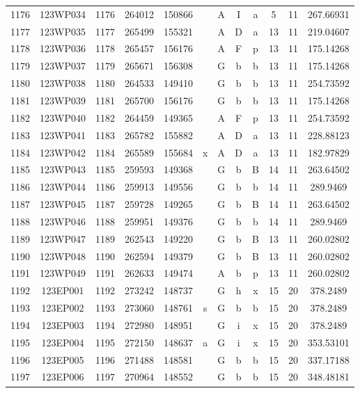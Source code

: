 \begin{tabular}{|*{12}{c|}}
1176 & 123WP034 & 1176 & 264012 & 150866 &  & A & I & a & 5 & 11 & 267.66931 \\ 
1177 & 123WP035 & 1177 & 265499 & 155321 &  & A & D & a & 13 & 11 & 219.04607 \\ 
1178 & 123WP036 & 1178 & 265457 & 156176 &  & A & F & p & 13 & 11 & 175.14268 \\ 
1179 & 123WP037 & 1179 & 265671 & 156308 &  & G & b & b & 13 & 11 & 175.14268 \\ 
1180 & 123WP038 & 1180 & 264533 & 149410 &  & G & b & b & 13 & 11 & 254.73592 \\ 
1181 & 123WP039 & 1181 & 265700 & 156176 &  & G & b & b & 13 & 11 & 175.14268 \\ 
1182 & 123WP040 & 1182 & 264459 & 149365 &  & A & F & p & 13 & 11 & 254.73592 \\ 
1183 & 123WP041 & 1183 & 265782 & 155882 &  & A & D & a & 13 & 11 & 228.88123 \\ 
1184 & 123WP042 & 1184 & 265589 & 155684 & x & A & D & a & 13 & 11 & 182.97829 \\ 
1185 & 123WP043 & 1185 & 259593 & 149368 &  & G & b & B & 14 & 11 & 263.64502 \\ 
1186 & 123WP044 & 1186 & 259913 & 149556 &  & G & b & b & 14 & 11 & 289.9469 \\ 
1187 & 123WP045 & 1187 & 259728 & 149265 &  & G & b & B & 14 & 11 & 263.64502 \\ 
1188 & 123WP046 & 1188 & 259951 & 149376 &  & G & b & b & 14 & 11 & 289.9469 \\ 
1189 & 123WP047 & 1189 & 262543 & 149220 &  & G & b & B & 13 & 11 & 260.02802 \\ 
1190 & 123WP048 & 1190 & 262594 & 149379 &  & G & b & B & 13 & 11 & 260.02802 \\ 
1191 & 123WP049 & 1191 & 262633 & 149474 &  & A & b & p & 13 & 11 & 260.02802 \\ 
1192 & 123EP001 & 1192 & 273242 & 148737 &  & G & h & x & 15 & 20 & 378.2489 \\ 
1193 & 123EP002 & 1193 & 273060 & 148761 & s & G & b & b & 15 & 20 & 378.2489 \\ 
1194 & 123EP003 & 1194 & 272980 & 148951 &  & G & i & x & 15 & 20 & 378.2489 \\ 
1195 & 123EP004 & 1195 & 272150 & 148637 & a & G & i & x & 15 & 20 & 353.53101 \\ 
1196 & 123EP005 & 1196 & 271488 & 148581 &  & G & b & b & 15 & 20 & 337.17188 \\ 
1197 & 123EP006 & 1197 & 270964 & 148552 &  & G & b & b & 15 & 20 & 348.48181 \\ 

\end{tabular}
